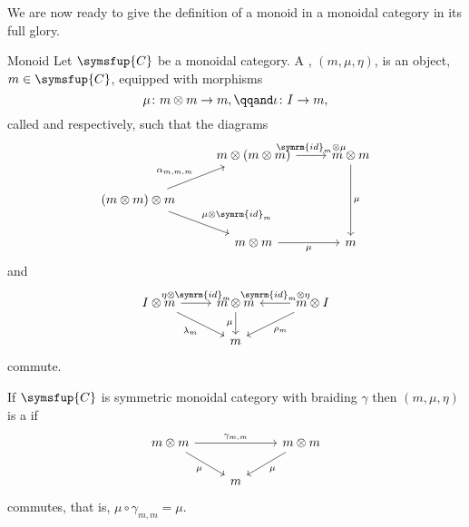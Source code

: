 \documentclass[fleqn]{NotesClass}
\newcommand{\cat}[1]{\symsfup{#1}}
\newcommand{\id}{\symrm{id}}
\begin{document}
    We are now ready to give the definition of a monoid in a monoidal category in its full glory.
    
    \begin{dfn}{Monoid}{}
        Let \(\cat{C}\) be a monoidal category.
        A , \((m, \mu, \eta)\), is an object, \(m \in \cat{C}\), equipped with morphisms
        \begin{equation}
            \mu \colon m \otimes m \to m, \qqand \iota \colon I \to m,
        \end{equation}
        called  and  respectively, such that the diagrams
        \begin{equation}
            \begin{tikzcd}
                & m \otimes (m \otimes m) \arrow[r, "\id_m \otimes \mu"] & m \otimes m \arrow[dd, "\mu"]\\
                (m \otimes m) \otimes m \arrow[ur, "{\alpha_{m,m,m}}"] \arrow[dr, "\mu \otimes \id_m"]\\
                & m \otimes m \arrow[r, "\mu"'] & m
            \end{tikzcd}
        \end{equation}
        and
        \begin{equation}
            \begin{tikzcd}
                I \otimes m \arrow[r, "\eta \otimes \id_m"] \arrow[dr, "\lambda_m"'] & m \otimes m \arrow[d, "\mu"'] & m \otimes I \arrow[l, "\id_m \otimes \eta"'] \arrow[dl, "\rho_m"]\\
                & m
            \end{tikzcd}
        \end{equation}
        commute.
        
        If \(\cat{C}\) is symmetric monoidal category with braiding \(\gamma\) then \((m, \mu, \eta)\) is a  if
        \begin{equation}
            \begin{tikzcd}
                m \otimes m \arrow[rr, "\gamma_{m,m}"] \arrow[dr, "\mu"'] && m \otimes m \arrow[dl, "\mu"]\\
                & m
            \end{tikzcd}
        \end{equation}
        commutes, that is, \(\mu \circ \gamma_{m,m} = \mu\).
    \end{dfn}
    
\end{document}
